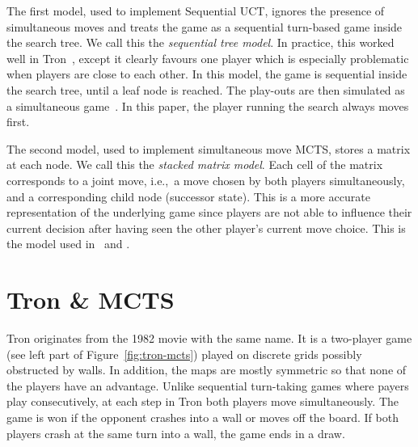 \documentclass{article}
\newcommand{\ie}{{i.e.,}~}
\begin{document}
The first model, used to implement Sequential UCT, ignores the presence of simultaneous moves and treats the game as a sequential turn-based game inside the search tree. 
We call this the {\it sequential tree model}. 
In practice, this worked well in Tron~\cite{teuling_tron,tron_cig}, except it clearly favours one player which is especially problematic when players are close to each other. 
In this model, the game is sequential inside the search tree, until a leaf node is reached. The play-outs are then simulated as a simultaneous game~\cite{teuling_tron}. 
In this paper, the player running the search always moves first. 

The second model, used to implement simultaneous move MCTS, stores a matrix at each node. 
We call this the {\it stacked matrix model}.
Each cell of the matrix corresponds to a joint move, \ie a move chosen by both players simultaneously, and a corresponding child node (successor state). 
This is a more accurate representation of the underlying game since players are not able to influence their current decision 
after having seen the other player's current move choice. 
This is the model used in~\cite{mcts_goofspiel} and \cite{cig_paper}.


\section{Tron \& MCTS}
\label{sec:tron_specific_mcts}

Tron originates from the 1982 movie with the same name. It is a two-player game (see left part of Figure~\ref{fig:tron-mcts}) played on discrete grids possibly obstructed by walls. In addition, the maps are mostly symmetric so that none of the players have an advantage. Unlike sequential turn-taking games where payers play consecutively, at each step in Tron both players move simultaneously. The game is won if the opponent crashes into a wall or moves off the board. If both players crash at the same turn into a wall, the game ends in a draw.
\end{document}
